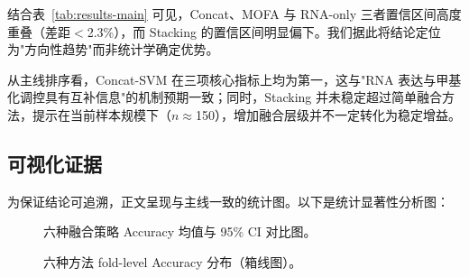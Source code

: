 结合表~\ref{tab:results-main} 可见，Concat、MOFA 与 RNA-only 三者置信区间高度重叠（差距$<$2.3\%），而 Stacking 的置信区间明显偏下。我们据此将结论定位为"方向性趋势"而非统计学确定优势。

从主线排序看，Concat-SVM 在三项核心指标上均为第一，这与"RNA 表达与甲基化调控具有互补信息"的机制预期一致；同时，Stacking 并未稳定超过简单融合方法，提示在当前样本规模下（$n\approx$150），增加融合层级并不一定转化为稳定增益。

\subsection{可视化证据}

为保证结论可追溯，正文呈现与主线一致的统计图。以下是统计显著性分析图：

\begin{figure}[H]
\centering
{}
\caption{六种融合策略 Accuracy 均值与 95\% CI 对比图。}
\label{fig:accuracy_ci_mainline}
\end{figure}

\begin{figure}[H]
\centering
{}
\caption{六种方法 fold-level Accuracy 分布（箱线图）。}
\label{fig:accuracy_distribution_mainline}
\end{figure}

